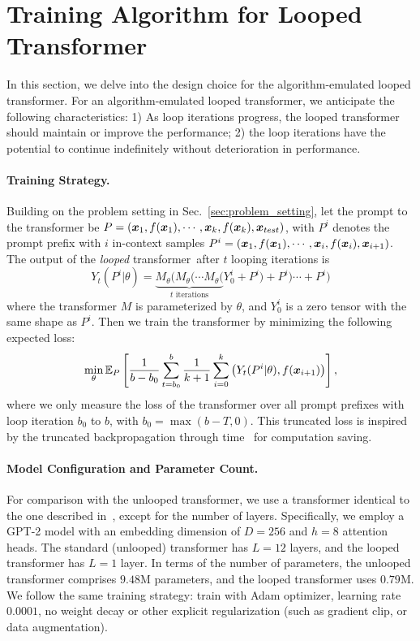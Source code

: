 \documentclass{article} %
\newcommand{\loopTF}{\emph{looped} transformer}
\theoremstyle{plain}
\theoremstyle{definition}
\theoremstyle{remark}
\begin{document}
\section{Training Algorithm for Looped Transformer}\label{sec:loop_design}
In this section, we delve into the design choice for the algorithm-emulated looped transformer.
For an algorithm-emulated looped transformer, we anticipate the following characteristics: 1) As loop iterations progress, the looped transformer should maintain or improve the performance; 2) the loop iterations have the potential to continue indefinitely without deterioration in performance.
\paragraph{Training Strategy.}
Building on the problem setting in Sec.~\ref{sec:problem_setting},
let the prompt to the transformer be $P=({\bm{x}}_1, f({\bm{x}}_1), \cdots, {\bm{x}}_k, f({\bm{x}}_k), {\bm{x}}_{test})$, with $P^i$ denotes the prompt prefix with $i$ in-context samples $P^i =({\bm{x}}_1, f({\bm{x}}_1), \cdots, {\bm{x}}_i, f({\bm{x}}_i), {\bm{x}}_{i+1})$. The output of the \loopTF\ after $t$ looping iterations is 
$$
Y_t(P^i | \theta) = \underbrace{M_{\theta}(M_{\theta}(\cdots M_{\theta}(}_{t \text{ iterations}}Y_0^i + P^i) + P^i) \cdots + P^i)
$$
where the transformer $M$ is parameterized by $\theta$, and $Y_0^i$ is a zero tensor with the same shape as $P^i$.
Then we train the transformer by minimizing the following expected loss:
\begin{equation}\label{eq:target_func}
\min_{\theta} \mathbb{E}_P \left[\frac{1}{b - b_0}\sum_{t=b_{0}}^{b} \frac{1}{k+1} \sum_{i=0}^k \left(Y_t(P^i | \theta), f({\bm{x}}_{i+1})\right)\right], 
\end{equation}
where we only measure the loss of the transformer over all prompt prefixes with loop iteration $b_0$ to $b$, with $b_0 = \max(b-T, 0)$. This truncated loss is inspired by the truncated backpropagation through time~\citep{Hochreiter1997LongSM, Hinton2013TrainingRN} for computation saving.
\paragraph{Model Configuration and Parameter Count.}
For comparison with the unlooped transformer, we use a transformer identical to the one described in~\citet{Garg2022WhatCT}, except for the number of layers. Specifically, we employ a GPT-2 model with an embedding dimension of $D=256$ and $h=8$ attention heads. The standard (unlooped) transformer has $L=12$ layers, and the looped transformer has $L=1$ layer. In terms of the number of parameters, the unlooped transformer comprises $9.48$M parameters,
and the looped transformer uses $0.79$M. We follow the same training strategy: train with Adam optimizer, learning rate $0.0001$, no weight decay or other explicit regularization (such as gradient clip, or data augmentation).
\end{document}
